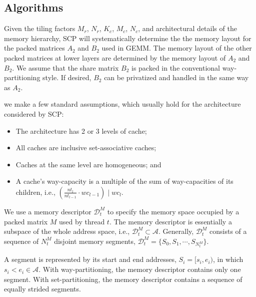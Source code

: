 \subsection{Algorithms}\label{subsec:formal}

Given the tiling factors $M_r$, $N_r$, $K_c$, $M_c$, $N_c$,
and architectural details of the memory hierarchy,
SCP will systematically determine the
the memory layout for the
packed matrices $A_2$ and $B_2$ used in GEMM.
The memory layout of the other packed matrices at
lower layers are determined by the memory layout of
$A_2$ and $B_2$.
We assume that the share matrix $B_2$ is packed
in the conventional way-partitioning style.
If desired, $B_2$ can be privatized and handled in the same way as $A_2$.

we make a few standard assumptions, which usually
hold for the architecture considered by SCP:
\begin{itemize}
\item The architecture has 2 or 3 levels of cache; %
\item All caches are inclusive set-associative caches; %
\item Caches at the same level are homogeneous; and %
\item A cache's way-capacity is a multiple of the sum of way-capacities of its children,
i.e., $(\frac{nt_l}{nt_{l-1}} \cdot wc_{l-1}) \mid wc_l$.
\end{itemize}

We use a memory descriptor $\mathcal{D}_t^M$ to specify 
the memory space occupied by a 
packed matrix $M$ used by thread $t$.
The memory descriptor is essentially a subspace of
the whole address space, i.e., $\mathcal{D}_t^M \subset \mathcal{A}$.
Generally, $\mathcal{D}_t^M$ consists of a sequence of $N_t^M$ disjoint memory segments,
$\mathcal{D}_t^M = \{ S_0, S_1, \cdots, S_{N_t^M}\}$.

A segment is represented by its start and end addresses, $S_i = [s_i, e_i)$,
in which $s_i < e_i \in \mathcal{A}$.
With way-partitioning, the memory descriptor contains only one segment.
With set-partitioning,
the memory descriptor contains a sequence of equally strided segments.

